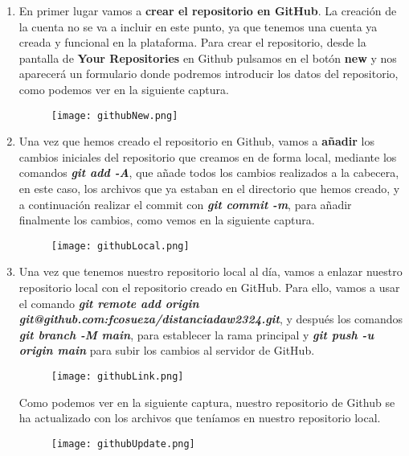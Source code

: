 \begin{enumerate}
    \item En primer lugar vamos a \textbf{crear el repositorio en GitHub}. La creación de la cuenta no se va a incluir en este punto, ya que tenemos una cuenta ya creada y funcional en la plataforma. Para crear el repositorio, desde la pantalla de \textbf{Your Repositories} en Github pulsamos en el botón \textbf{new} y nos aparecerá un formulario donde podremos introducir los datos del repositorio, como podemos ver en la siguiente captura.

    \begin{figure}[H]
        \centering
        \texttt{[image: githubNew.png]}
    \end{figure}

    \item Una vez que hemos creado el repositorio en Github, vamos a \textbf{añadir} los cambios iniciales del repositorio que creamos en de forma local, mediante los comandos \textbf{\textit{git add -A}}, que añade todos los cambios realizados a la cabecera, en este caso, los archivos que ya estaban en el directorio que hemos creado, y a continuación realizar el commit con \textbf{\textit{git commit -m}}, para añadir finalmente los cambios, como vemos en la siguiente captura.

        \begin{figure}[H]
        \centering
        \texttt{[image: githubLocal.png]}
    \end{figure}

    \item Una vez que tenemos nuestro repositorio local al día, vamos a enlazar nuestro repositorio local con el repositorio creado en GitHub. Para ello, vamos a usar el comando \textbf{\textit{git remote add origin git@github.com:fcosueza/distanciadaw2324.git}}, y después los comandos \textbf{\textit{git branch -M main}}, para establecer la rama principal y \textbf{\textit{git push -u origin main}} para subir los cambios al servidor de GitHub.

    \begin{figure}[H]
        \centering
        \texttt{[image: githubLink.png]}
    \end{figure}

    Como podemos ver en la siguiente captura, nuestro repositorio de Github se ha actualizado con los archivos que teníamos en nuestro repositorio local.

    \begin{figure}[H]
        \centering
        \texttt{[image: githubUpdate.png]}
    \end{figure}


\end{enumerate}
